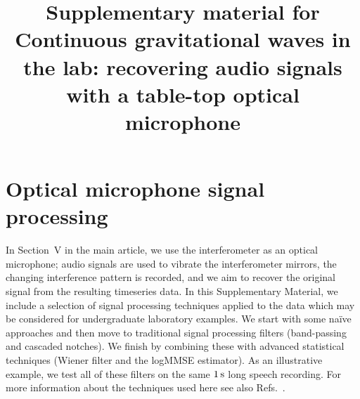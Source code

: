 \documentclass[aps,pra,superscriptaddress,reprint,nofootinbib]{revtex4-1}
\begin{document}
\title{Supplementary material for \\Continuous gravitational waves in the lab: recovering audio signals with a table-top optical microphone} 
\maketitle

\section{Optical microphone signal processing}


In Section~V in the main article, we use the interferometer as an optical microphone; audio signals are used to vibrate the interferometer mirrors, the changing interference pattern is recorded, and we aim to recover the original signal from the resulting timeseries data.
In this Supplementary Material, we include a selection of signal processing techniques applied to the data which may be considered for undergraduate laboratory examples. 
We start with some na{\"i}ve approaches and then move to traditional signal processing filters (band-passing and cascaded notches). 
We finish by combining these with advanced statistical techniques (Wiener filter and the logMMSE estimator). 
As an illustrative example, we test all of these filters on the same $1\,{\rm s}$ long speech recording.
For more information about the techniques used here see also Refs.~\cite{Mitra:2011, Lyons:2011, Stein:2000, OpenheimSchaferBuck:1999, PrakisManolakis:1996,10.5555/151045}.
\end{document}
